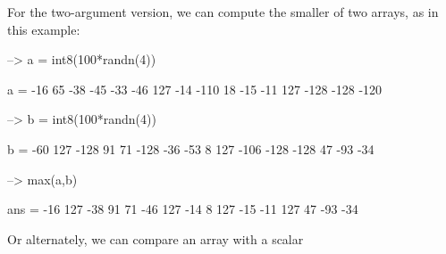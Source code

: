 For the two-\/argument version, we can compute the smaller of two arrays, as in this example\-:


\begin{DoxyVerbInclude}
--> a = int8(100*randn(4))

a = 
  -16   65  -38  -45 
  -33  -46  127  -14 
 -110   18  -15  -11 
  127 -128 -128 -120 

--> b = int8(100*randn(4))

b = 
  -60  127 -128   91 
   71 -128  -36  -53 
    8  127 -106 -128 
 -128   47  -93  -34 

--> max(a,b)

ans = 
 -16 127 -38  91 
  71 -46 127 -14 
   8 127 -15 -11 
 127  47 -93 -34 
\end{DoxyVerbInclude}


Or alternately, we can compare an array with a scalar


